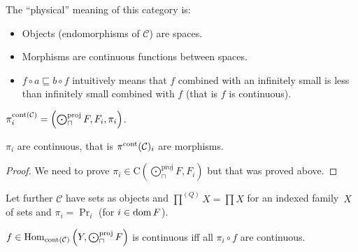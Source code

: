 \begin{rem}
  The ``physical'' meaning of this category is:
  \begin{itemize}
    \item Objects (endomorphisms of $\mathcal{C}$) are spaces.
    
    \item Morphisms are continuous functions between spaces.
    
    \item $f \circ a \sqsubseteq b \circ f$ intuitively means that $f$
    combined with an infinitely small is less than infinitely small combined
    with $f$ (that is $f$ is continuous).
  \end{itemize}
\end{rem}

\begin{defn}
  $\pi^{\operatorname{cont} (\mathcal{C})}_i = \left( \bigodot^{\text{proj}}_{\sqcap} F , F_i ,
  \pi_i \right)$.
\end{defn}

\begin{prop}
  $\pi_i$ are continuous, that is $\pi^{\operatorname{cont}}
  (\mathcal{C})_i$ are morphisms.
\end{prop}

\begin{proof}
  We need to prove $\pi_i \in \mathrm{C} \left( \bigodot^{\text{proj}}_{\sqcap} F , F_i \right)$
  but that was proved above.
\end{proof}

Let further $\mathcal{C}$ have sets as objects and $\prod^{(Q)}X=\prod X$ for an indexed family~$X$ of sets and $\pi_i = \Pr_i$ (for $i \in \operatorname{dom} F$).

\begin{lem}
  $f \in \operatorname{Hom}_{\operatorname{cont} (\mathcal{C})} \left( Y ,
  \bigodot^{\text{proj}}_{\sqcap} F \right)$ is continuous iff all $\pi_i \circ f$ are continuous.
\end{lem}

